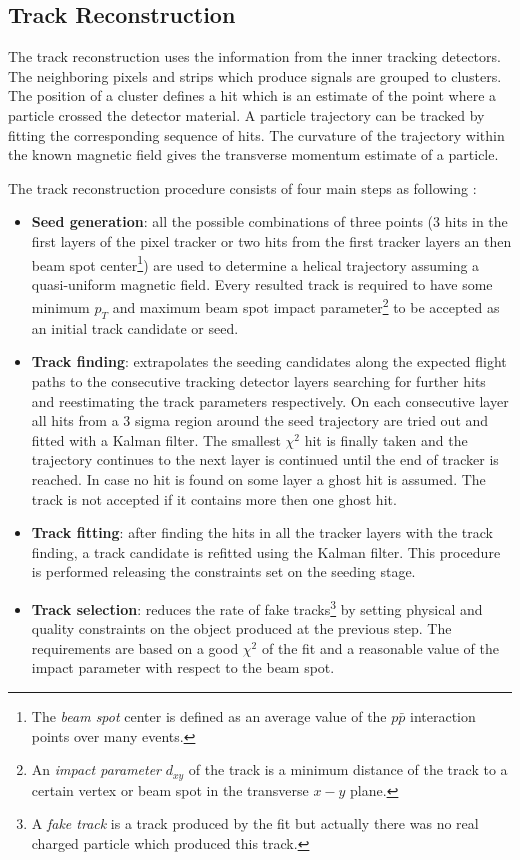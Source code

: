 \subsection{Track Reconstruction}\label{ssec:trkReco}

The track reconstruction uses the information from the inner tracking detectors. The neighboring pixels and strips which
produce signals are grouped to clusters. The position of a cluster defines a hit which is an estimate of the point where a particle crossed the
detector material. A particle trajectory can be tracked by fitting the corresponding sequence of hits. The curvature 
of the trajectory within the known magnetic field gives the transverse momentum estimate of a particle.

The track reconstruction procedure consists of four main steps as following \cite{Chatrchyan:2014fea}:

\begin{itemize}
 \item \textbf{Seed generation}: all the possible combinations of three points (3 hits in the first layers of the pixel tracker or
 two hits from the first tracker layers an then beam spot center\footnote{The \textit{beam spot} center is 
 defined as an average value of the $p\bar{p}$ interaction points over many events.}) are used to determine a helical trajectory 
 assuming a quasi-uniform magnetic field. Every resulted track is required to have some minimum $p_{T}$ and maximum beam spot impact 
 parameter\footnote{An \textit{impact parameter} $d_{xy}$ of the track is a minimum distance of the track to a certain vertex or 
 beam spot in the transverse $x-y$ plane.} to be accepted as an initial track candidate or seed.
 \item \textbf{Track finding}: extrapolates the seeding candidates along the expected flight paths to the consecutive tracking detector layers searching 
 for further hits and reestimating the track parameters respectively. On each consecutive layer all hits from a 3 sigma region around the seed trajectory
 are tried out and fitted with a Kalman filter\cite{Fruhwirth:1987fm}. The smallest $\chi^{2}$ hit is finally taken and the trajectory
 continues to the next layer is continued until the end of tracker is reached. In case no hit is found on some layer a ghost hit is assumed. The track is not
 accepted if it contains more then one ghost hit.
 \item \textbf{Track fitting}: after finding the hits in all the tracker layers with the track finding, a track candidate is refitted using the Kalman filter. 
 This procedure is performed releasing the constraints set on the seeding stage.
 \item \textbf{Track selection}: reduces the rate of fake tracks\footnote{A \textit{fake track} is a track produced by the fit but actually there was
 no real charged particle which produced this track.} by setting physical and quality constraints on the object produced at the previous step. The requirements
 are based on a good $\chi^{2}$ of the fit and a reasonable value of the impact parameter with respect to the beam spot.
\end{itemize}

